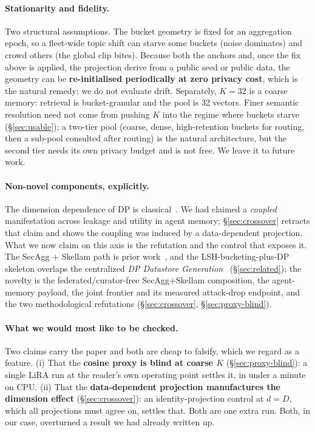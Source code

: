 \documentclass[pdflatex,sn-mathphys-num,iicol]{sn-jnl}
\theoremstyle{thmstyleone}%
\theoremstyle{thmstyletwo}%
\theoremstyle{thmstylethree}%
\newcommand{\secref}[1]{\S\ref{#1}}
\begin{document}
\paragraph{Stationarity and fidelity.} Two structural assumptions. The bucket geometry is fixed for an
aggregation epoch, so a fleet-wide topic shift can starve some buckets (noise dominates) and crowd
others (the global clip bites). Because both the anchors and, once the fix above is applied, the
projection derive from a public seed or public data, the geometry can be \textbf{re-initialised
periodically at zero privacy cost}, which is the natural remedy; we do not evaluate drift. Separately,
$K = 32$ is a coarse memory: retrieval is bucket-granular and the pool is 32 vectors. Finer semantic
resolution need not come from pushing $K$ into the regime where buckets starve (\secref{sec:usable}); a
two-tier pool (coarse, dense, high-retention buckets for routing, then a sub-pool consulted after
routing) is the natural architecture, but the second tier needs its own privacy budget and is not
free. We leave it to future work.

\paragraph{Non-novel components, explicitly.} The dimension dependence of DP is
classical~\cite{chen2022price, bassily2014erm}. We had claimed a \emph{coupled} manifestation across
leakage and utility in agent memory; \secref{sec:crossover} retracts that claim and shows the coupling
was induced by a data-dependent projection. What we now claim on this axis is the refutation and the
control that exposes it. The SecAgg $+$ Skellam path is prior
work~\cite{bonawitz2017secagg, agarwal2021skellam, kairouz2021ddgauss}, and the
LSH-bucketing-plus-DP skeleton overlaps the centralized \emph{DP Datastore
Generation}~\cite{abouelenein2026dpdatastore} (\secref{sec:related}); the novelty is the
federated/curator-free SecAgg+Skellam composition, the agent-memory payload, the joint frontier and
its measured attack-drop endpoint, and the two methodological refutations
(\secref{sec:crossover}, \secref{sec:proxy-blind}).

\paragraph{What we would most like to be checked.} Two claims carry the paper and both are cheap to
falsify, which we regard as a feature. (i) That the \textbf{cosine proxy is blind at coarse $K$}
(\secref{sec:proxy-blind}): a single LiRA run at the reader's own operating point settles it, in
under a minute on CPU. (ii) That the \textbf{data-dependent projection manufactures the dimension
effect} (\secref{sec:crossover}): an identity-projection control at $d = D$, which all projections
must agree on, settles that. Both are one extra run. Both, in our case, overturned a result we had
already written up.
\end{document}
